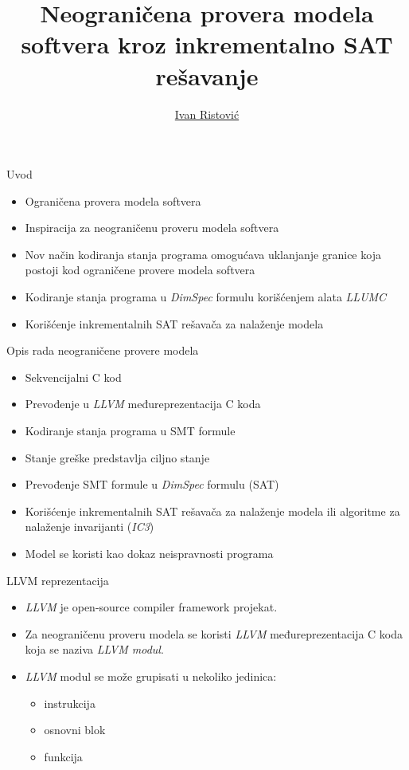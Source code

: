 \documentclass{beamer}
\title{Neograničena provera modela softvera kroz inkrementalno SAT rešavanje}
\author{\href{mailto:ivan_ristovic@math.rs}{Ivan Ristovi\'c}}
\date{}
\begin{document}
\begin{frame}
    \titlepage
\end{frame}

\begin{frame}{Uvod}
    \begin{itemize}
        \item Ograničena provera modela softvera
        \item Inspiracija za neograničenu proveru modela softvera
        \item Nov način kodiranja stanja programa omogućava uklanjanje granice koja postoji kod ograničene provere modela softvera
        \item Kodiranje stanja programa u \emph{DimSpec} formulu korišćenjem alata \emph{LLUMC}
        \item Korišćenje inkrementalnih SAT rešavača za nalaženje modela
    \end{itemize}
\end{frame}

\begin{frame}{Opis rada neograničene provere modela}
    \begin{itemize}
        \item Sekvencijalni C kod
        \item Prevođenje u \emph{LLVM} međureprezentacija C koda
        \item Kodiranje stanja programa u SMT formule
        \item Stanje greške predstavlja ciljno stanje
        \item Prevođenje SMT formule u \emph{DimSpec} formulu (SAT)
        \item Korišćenje inkrementalnih SAT rešavača za nalaženje modela ili algoritme za nalaženje invarijanti (\emph{IC3})
        \item Model se koristi kao dokaz neispravnosti programa
    \end{itemize}
\end{frame}

\begin{frame}{LLVM reprezentacija}
    \begin{itemize}
        \item \emph{LLVM} je open-source compiler framework projekat.
        \item Za neograničenu proveru modela se koristi \emph{LLVM} međureprezentacija C koda koja se naziva \emph{LLVM modul}.
        \item \emph{LLVM} modul se može grupisati u nekoliko jedinica:
            \begin{itemize}
                \item instrukcija
                \item osnovni blok
                \item funkcija
            \end{itemize}
    \end{itemize}
\end{frame}
\end{document}
